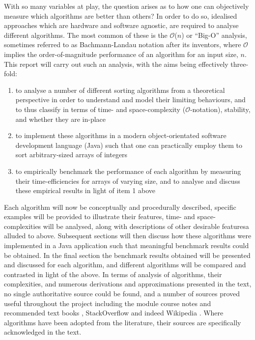 \documentclass[12pt,a4paper]{article}
\begin{document}
With so many variables at play, the question arises as to how one can objectively measure which algorithms are better than others? In order to do so, idealised approaches which are hardware and software agnostic, are required to analyse different algorithms. The most common of these is the $\mathcal{O}$($n$) or ``Big-O'' analysis, sometimes referred to as Bachmann-Landau notation \cite{bachmann_analytische_1894, landau_handbuch_1909} after its inventors, where $\mathcal{O}$ implies the order-of-magnitude performance of an algorithm for an input size, $n$. This report will carry out such an analysis, with the aims being effectively three-fold:

\begin{enumerate}
\item to analyse a number of different sorting algorithms from a theoretical perspective in order to understand and model their limiting behaviours, and to thus classify in terms of time- and space-complexity ($\mathcal{O}$-notation), stability, and whether they are in-place
\item to implement these algorithms in a modern object-orientated software development language (Java) such that one can practically employ them to sort arbitrary-sized arrays of integers
\item to empirically benchmark the performance of each algorithm by measuring their time-efficiencies for arrays of varying size, and to analyse and discuss these empirical results in light of item 1 above
\end{enumerate}

Each algorithm will now be conceptually and procedurally described, specific examples will be provided to illustrate their features, time- and space-complexities will be analysed, along with descriptions of other desirable featuresa alluded to above. Subsequent sections will then discuss how these algorithms were implemented in a Java application such that meaningful benchmark results could be obtained. In the final section the benchmark results obtained will be presented and discussed for each algorithm, and different algorithms will be compared and contrasted in light of the above. In terms of analysis of algorithms, their complexities, and numerous derivations and approximations presented in the text, no single authoritative source could be found, and a number of sources proved useful throughout the project including the module course notes \cite{mannionBubbleSort} and recommended text books \cite{harel_algorithmics_2004, heineman_algorithms_2009}, StackOverflow \cite{stack} and indeed Wikipedia \cite{wiki}. Where algorithms have been adopted from the literature, their sources are specifically acknowledged in the text.
\end{document}
